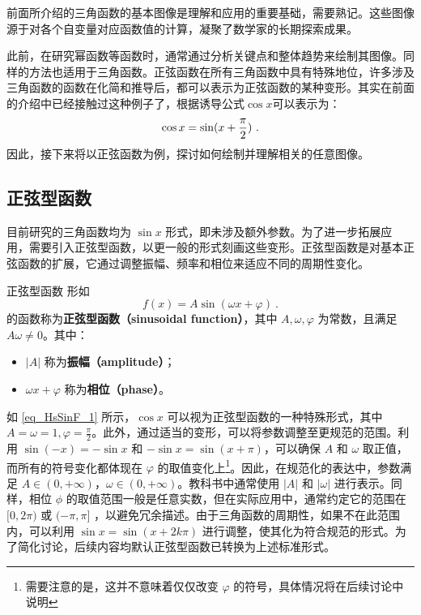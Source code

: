 
\begin{issues}
\issueDraft
\end{issues}


前面所介绍的三角函数的基本图像是理解和应用的重要基础，需要熟记。这些图像源于对各个自变量对应函数值的计算，凝聚了数学家的长期探索成果。

此前，在研究幂函数等函数时，通常通过分析关键点和整体趋势来绘制其图像。同样的方法也适用于三角函数。正弦函数在所有三角函数中具有特殊地位，许多涉及三角函数的函数在化简和推导后，都可以表示为正弦函数的某种变形。其实在前面的介绍中已经接触过这种例子了，根据诱导公式$\cos x$可以表示为：
\begin{equation}\label{eq_HsSinF_1}
\cos x=\sin(x+{\pi\over2})~.
\end{equation}
因此，接下来将以正弦函数为例，探讨如何绘制并理解相关的任意图像。

\subsection{正弦型函数}

目前研究的三角函数均为 $\sin x$ 形式，即未涉及额外参数。为了进一步拓展应用，需要引入正弦型函数，以更一般的形式刻画这些变形。正弦型函数是对基本正弦函数的扩展，它通过调整振幅、频率和相位来适应不同的周期性变化。

\begin{definition}{正弦型函数}
形如
\begin{equation}
f(x) = A\sin(\omega x + \varphi)~.
\end{equation}
的函数称为\textbf{正弦型函数（sinusoidal function）}，其中 $A, \omega, \varphi$ 为常数，且满足 $A\omega \neq 0$。其中：
\begin{itemize}
\item $|A|$ 称为\textbf{振幅（amplitude）}；
\item $\omega x + \varphi$ 称为\textbf{相位（phase）}。
\end{itemize}
\end{definition}

如 \autoref{eq_HsSinF_1} 所示，$\cos x$ 可以视为正弦型函数的一种特殊形式，其中 $\displaystyle A = \omega = 1, \varphi = \frac{\pi}{2}$。此外，通过适当的变形，可以将参数调整至更规范的范围。利用 $\sin(-x) = -\sin x$ 和 $-\sin x = \sin(x + \pi)$，可以确保 $A$ 和 $\omega$ 取正值，而所有的符号变化都体现在 $\varphi$ 的取值变化上\footnote{需要注意的是，这并不意味着仅仅改变 $\varphi$ 的符号，具体情况将在后续讨论中说明}。因此，在规范化的表达中，参数满足 $A \in (0, +\infty)$，$\omega \in (0, +\infty)$。教科书中通常使用 $|A|$ 和 $|\omega|$ 进行表示。同样，相位  $\phi $ 的取值范围一般是任意实数，但在实际应用中，通常约定它的范围在$[0, 2\pi)$  或  $(-\pi, \pi]$ ，以避免冗余描述。由于三角函数的周期性，如果不在此范围内，可以利用 $\sin x = \sin(x + 2k\pi)$ 进行调整，使其化为符合规范的形式。为了简化讨论，后续内容均默认正弦型函数已转换为上述标准形式。

